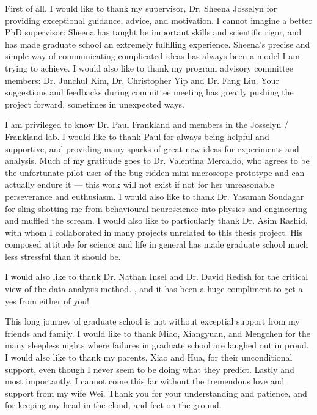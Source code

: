 First of all, I would like to thank my supervisor, Dr. Sheena Josselyn for providing exceptional guidance, advice, and motivation. I cannot imagine a better PhD supervisor: Sheena has taught be important skills and scientific rigor, and has made graduate school an extremely fulfilling experience. Sheena's precise and simple way of communicating complicated ideas has always been a model I am trying to achieve. I would also like to thank my program advisory committee members: Dr. Junchul Kim, Dr. Christopher Yip and Dr. Fang Liu. Your suggestions and feedbacks during committee meeting has greatly pushing the project forward, sometimes in unexpected ways. 

I am privileged to know Dr. Paul Frankland and members in the Josselyn / Frankland lab. I would like to thank Paul for always being helpful and supportive, and providing many sparks of great new ideas for experiments and analysis. Much of my gratitude goes to Dr. Valentina Mercaldo, who agrees to be the unfortunate pilot user of the bug-ridden mini-microscope prototype and can actually endure it --- this work will not exist if not for her unreasonable perseverance and euthusiasm. I would also like to thank Dr. Yasaman Soudagar for sling-shotting me from behavioural neuroscience into physics and engineering and muffled the scream. I would also like to particularly thank Dr. Asim Rashid, with whom I collaborated in many projects unrelated to this thesis project. His composed attitude for science and life in general has made graduate school much less stressful than it should be. 

I would also like to thank Dr. Nathan Insel and Dr. David Redish for the critical view of the data analysis method.  , and it has been a huge compliment to get a yes from either of you! 

This long journey of graduate school is not without exceptial support from my friends and family.  I would like to thank Miao, Xiangyuan, and Mengchen for the many sleepless nights where failures in graduate school are laughed out in proud. I would also like to thank my parents, Xiao and Hua, for their unconditional support, even though I never seem to be doing what they predict. Lastly and most importantly, I cannot come this far without the tremendous love and support from my wife Wei. Thank you for your understanding and patience, and for keeping my head in the cloud, and feet on the ground. 


